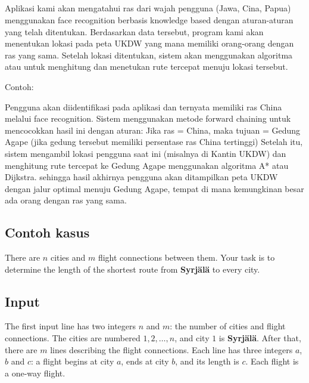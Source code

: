 \documentclass{article}
\begin{document}
\subsection{
}


Aplikasi kami akan mengatahui ras dari wajah pengguna (Jawa, Cina, Papua) menggunakan face recognition berbasis knowledge based dengan aturan-aturan yang telah ditentukan.
Berdasarkan data tersebut, program kami akan menentukan lokasi pada peta UKDW yang mana memiliki orang-orang dengan ras yang sama.
Setelah lokasi ditentukan, sistem akan menggunakan algoritma  atau  untuk menghitung dan menetukan rute tercepat menuju lokasi tersebut.
\newline

\noindent Contoh:

Pengguna akan diidentifikasi pada aplikasi dan ternyata memiliki ras China melalui face recognition. Sistem menggunakan metode forward chaining untuk mencocokkan hasil ini dengan aturan:
\newline
Jika ras = China, maka tujuan = Gedung Agape (jika gedung tersebut memiliki persentase ras China tertinggi)
\newline
Setelah itu, sistem mengambil lokasi pengguna saat ini (misalnya di Kantin UKDW) dan menghitung rute tercepat ke Gedung Agape  menggunakan algoritma A* atau Dijkstra. sehingga hasil akhirnya pengguna akan ditampilkan peta UKDW dengan jalur optimal menuju Gedung Agape, tempat di mana kemungkinan besar ada orang dengan ras yang sama.

\subsection{Contoh kasus}

There are $n$ cities and $m$ flight connections between them. Your task is to determine the length of the shortest route from \textbf{Syrjälä} to every city.

\subsection*{Input}

The first input line has two integers $n$ and $m$: the number of cities and flight connections. The cities are numbered $1,2,\dots,n$, and city $1$ is \textbf{Syrjälä}.
After that, there are $m$ lines describing the flight connections. Each line has three integers $a$, $b$ and $c$: a flight begins at city $a$, ends at city $b$, and its length is $c$. Each flight is a one-way flight.
\end{document}
